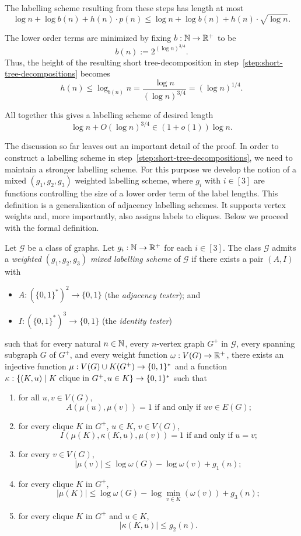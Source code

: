 \documentclass{patmorin}
\renewcommand{\le}{\leqslant}
\renewcommand{\leq}{\leqslant}
\newcommand{\defin}[1]{\emph{\textcolor{brightmaroon}{#1}}}
\DeclarePairedDelimiter{\set}{\{}{\}}
\begin{document}
The labelling scheme resulting from these steps has length at most $$\log n +\log b(n) + h(n)\cdot p(n) \leq \log n +\log b(n) + h(n)\cdot \sqrt{\log n}.$$

The lower order terms are minimized by fixing $b:\mathbb{N}\to\mathbb{R}^+$ to be
\[
b(n):= 2^{(\log n)^{3/4}}.
\]
Thus, the height of the resulting short tree-decomposition in step~\ref{step:short-tree-decompositions} becomes
\[
h(n) \leq \log_{b(n)}n = \frac{\log n}{(\log n)^{3/4}} = (\log n)^{1/4}.
\]

All together this gives a labelling scheme of desired length $$\log n + O(\log n)^{3/4}\in (1 + o(1))\log n.$$

The discussion so far leaves out an important detail of the proof. In order to construct a labelling scheme in step~\ref{step:short-tree-decompositions},
we need to maintain a stronger labelling scheme.
For this purpose we develop the notion of a mixed $(g_1,g_2,g_3)$ weighted labelling scheme, where $g_i$ with $i\in[3]$ are functions controlling the size of a lower order term of the label lengths.
This definition is a generalization of adjacency labelling schemes.
It supports vertex weights and, more importantly, also assigns labels to cliques. Below we proceed with the formal definition.

Let $\mathcal{G}$ be a class of graphs.
Let $g_i:\mathbb{N}\to\mathbb{R}^+$ for each $i\in[3]$.
The class  $\mathcal{G}$ admits a \defin{weighted $(g_1,g_2,g_3)$ mixed labelling scheme} of $\mathcal{G}$ if there exists a pair $(A,I)$ with
\begin{itemize}[nosep,nolistsep]
     \item $A:(\{0,1\}^*)^2\to\{0,1\}$ (the \defin{adjacency tester}); and
     \item $I:(\{0,1\}^*)^3\to\{0,1\}$ (the \defin{identity tester})
\end{itemize}
such that
for every natural $n\in\mathbb{N}$,
every $n$-vertex graph $G^+$ in $\mathcal{G}$,
every spanning subgraph $G$ of $G^+$, and
every weight function $\omega:V(G)\to \mathbb{R}^+$,
there exists an injective function $\mu: V(G)\cup K(G^+) \to \set{0,1}^*$ and a function $\kappa:\{(K, u)\mid \textrm{$K$ clique in $G^+$}, u\in K\}\to \set{0,1}^*$
such that
\begin{enumerate}[nosep,nolistsep,label=(\roman*)]
    \item for all $u,v\in V(G)$,
    \[
    \textrm{$A(\mu(u),\mu(v))=1$ if and only if $uv\in E(G)$;}
    \]
    \item for every clique $K$ in $G^+$, $u\in K$, $v\in V(G)$,
    \[
    \textrm{$I(\mu(K),\kappa(K, u),\mu(v))=1$ if and only if $u=v$;}
    \]
    \item for every $v\in V(G)$,
    \[
    |\mu(v)| \leq \log \omega(G) - \log\omega(v) + g_1(n); 
    \]   
    \item for every clique $K$ in $G^+$,
    \[
    |\mu(K)|\le \log \omega(G) - \log\min_{v\in K}(\omega(v)) + g_3(n);
    \]
    \item  for every clique $K$ in $G^+$ and $u\in K$,
    \[
    |\kappa(K, u)| \leq g_2(n).
    \]
\end{enumerate}
\end{document}

